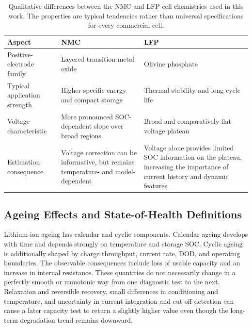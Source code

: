 \documentclass[
    a4paper,
    12pt,
    titlepage,
    bibliography=totoc,
    twoside=on,
    parskip=false,
    numbers=noenddot,
    cleardoublepage=empty,
    DIV=12,
    BCOR=12.0mm,
    headheight=36pt,
    headings=openright
]{scrreprt}
\begin{document}
\begin{table}[H]
    \centering
    \small
    \caption[Estimation-relevant differences between NMC and LFP cells.]{Qualitative differences between the NMC and LFP cell chemistries used in this work. The properties are typical tendencies rather than universal specifications for every commercial cell.}
    \label{tab:nmc_lfp_foundations}
    \begin{tabularx}{\textwidth}{>{\raggedright\arraybackslash}p{3.2cm}YY}
        \toprule
        Aspect & NMC & LFP \\
        \midrule
        Positive-electrode family & Layered transition-metal oxide & Olivine phosphate \\
        Typical application strength & Higher specific energy and compact storage & Thermal stability and long cycle life \\
        Voltage characteristic & More pronounced SOC-dependent slope over broad regions & Broad and comparatively flat voltage plateau \\
        Estimation consequence & Voltage correction can be informative, but remains temperature- and model-dependent & Voltage alone provides limited SOC information on the plateau, increasing the importance of current history and dynamic features \\
        \bottomrule
    \end{tabularx}
\end{table}

\subsection{Ageing Effects and State-of-Health Definitions}
Lithium-ion ageing has calendar and cyclic components. Calendar ageing develops with time and depends strongly on temperature and storage SOC. Cyclic ageing is additionally shaped by charge throughput, current rate, DOD, and operating boundaries. The observable consequences include loss of usable capacity and an increase in internal resistance. These quantities do not necessarily change in a perfectly smooth or monotonic way from one diagnostic test to the next. Relaxation and reversible recovery, small differences in conditioning and temperature, and uncertainty in current integration and cut-off detection can cause a later capacity test to return a slightly higher value even though the long-term degradation trend remains downward.\autocite{kassemCalendarAgingGraphite2012,baraiComparisonMethodologiesNoninvasive2019,berecibarCriticalReviewState2016}
\end{document}
